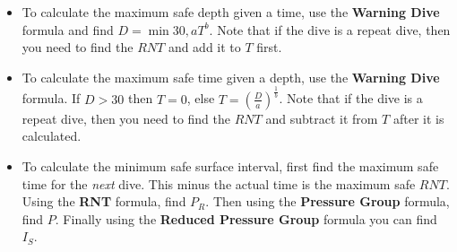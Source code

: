 \documentclass[17pt]{article}
\begin{document}
\begin{itemize}
	\item To calculate the maximum safe depth given a time, use the \textbf{Warning Dive} formula and find $D = \min 30, aT^b$. Note that if the dive is a repeat dive, then you need to find the $RNT$ and add it to $T$ first.
	\item To calculate the maximum safe time given a depth, use the \textbf{Warning Dive} formula. If $D > 30$ then $T = 0$, else $T = \left(\frac{D}{a}\right)^{\frac{1}{b}}$. Note that if the dive is a repeat dive, then you need to find the $RNT$ and subtract it from $T$ after it is calculated.
	\item To calculate the minimum safe surface interval, first find the maximum safe time for the \emph{next} dive. This minus the actual time is the maximum safe $RNT$. Using the \textbf{RNT} formula, find $P_R$. Then using the \textbf{Pressure Group} formula, find $P$. Finally using the \textbf{Reduced Pressure Group} formula you can find $I_S$.
\end{itemize}
\end{document}

